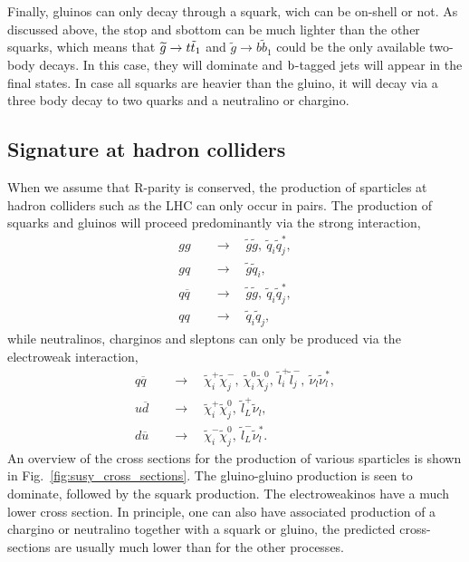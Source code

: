 Finally, gluinos can only decay through a squark, wich can be on-shell or not. 
As discussed above, the stop and sbottom can be much lighter than the other squarks, which means
that $\widetilde{g} \rightarrow t\tilde{t}_1$ and $\widetilde{g} \rightarrow b\widetilde{b}_1$ could
be the only available two-body decays. In this case, they will dominate and $\mathrm{b}$-tagged jets will
appear in the final states. 
In case all squarks are heavier than the gluino, it will decay via a three body decay to two quarks
and a neutralino or chargino. 


\subsection{Signature at hadron colliders}

When we assume that R-parity is conserved, the production of sparticles at hadron colliders such as
the LHC can only occur in pairs. 
The production of squarks and gluinos will proceed predominantly via the strong interaction, 
\begin{align}
  gg \quad &\rightarrow \quad \tilde{g}\tilde{g}, \ \tilde{q}_i\tilde{q}_j^*, \\
  gq \quad &\rightarrow \quad \tilde{g}\tilde{q}_i, \\
  q\overline{q} \quad &\rightarrow \quad \tilde{g}\tilde{g}, \ \tilde{q}_i\tilde{q}_j^*, \\
  qq \quad &\rightarrow \quad \tilde{q}_i\tilde{q}_j, 
\end{align}
while neutralinos, charginos and sleptons can only be produced via the electroweak interaction, 
\begin{align}
  q\overline{q} \quad &\rightarrow \quad \tilde{\chi}_i^+\tilde{\chi}_j^-,\ 
\tilde{\chi}_i^0\tilde{\chi}_j^0, \ \tilde{l}_i^+\tilde{l}_j^-, \ \tilde{\nu}_l\tilde{\nu}_l^*, \\
  u\overline{d} \quad &\rightarrow \quad \tilde{\chi}_i^+ \tilde{\chi}_j^0, \
\tilde{l}_L^+\tilde{\nu}_l, \\
  d\overline{u} \quad &\rightarrow \quad \tilde{\chi}_i^- \tilde{\chi}_j^0, \
\tilde{l}_L^-\tilde{\nu}_l^* .
\end{align}
An overview of the cross sections for the production of various sparticles is shown in
Fig.~\ref{fig:susy_cross_sections}. The gluino-gluino production is seen to dominate, followed by
the squark production. The electroweakinos have a much lower cross section. 
In principle, one can also have associated production of a chargino or neutralino together with a
squark or gluino, the predicted cross-sections are usually much lower than for the other processes.

